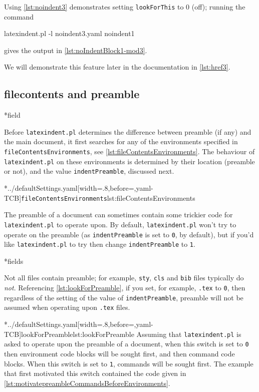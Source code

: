 	Using \cref{lst:noindent3} demonstrates setting \texttt{lookForThis} to 0 (off); running
	the command
	\begin{commandshell}
latexindent.pl -l noindent3.yaml noindent1
\end{commandshell}
	gives the output in \cref{lst:noIndentBlock1-mod3}.


	We will demonstrate this feature later in the documentation in \cref{lst:href3}.

\subsection{filecontents and preamble}
*{field}

	Before \texttt{latexindent.pl} determines the difference between preamble (if any) and
	the main document, it first searches for any of the environments specified in
	\texttt{fileContentsEnvironments}, see \cref{lst:fileContentsEnvironments}. The behaviour
	of \texttt{latexindent.pl} on these environments is determined by their location
	(preamble or not), and the value \texttt{indentPreamble}, discussed next.

	\cmhlistingsfromfile[style=fileContentsEnvironments]*{../defaultSettings.yaml}[width=.8\linewidth,before=\centering,yaml-TCB]{\texttt{fileContentsEnvironments}}{lst:fileContentsEnvironments}


	The preamble of a document can sometimes contain some trickier code for
	\texttt{latexindent.pl} to operate upon. By default, \texttt{latexindent.pl} won't try to
	operate on the preamble (as \texttt{indentPreamble} is set to \texttt{0}, by default),
	but if you'd like \texttt{latexindent.pl} to try then change \texttt{indentPreamble} to
	\texttt{1}.

*{fields}

	Not all files contain preamble; for example, \texttt{sty}, \texttt{cls} and \texttt{bib}
	files typically do \emph{not}. Referencing \cref{lst:lookForPreamble}, if you set, for
	example, \texttt{.tex} to \texttt{0}, then regardless of the setting of the value of
	\texttt{indentPreamble}, preamble will not be assumed when operating upon \texttt{.tex}
	files.

	\cmhlistingsfromfile[style=lookForPreamble]*{../defaultSettings.yaml}[width=.8\linewidth,before=\centering,yaml-TCB]{lookForPreamble}{lst:lookForPreamble}
	Assuming that \texttt{latexindent.pl} is asked to operate upon the preamble of a
	document, when this switch is set to \texttt{0} then environment code blocks will be
	sought first, and then command code blocks. When this switch is set to \texttt{1},
	commands will be sought first. The example that first motivated this switch contained the
	code given in \cref{lst:motivatepreambleCommandsBeforeEnvironments}.

